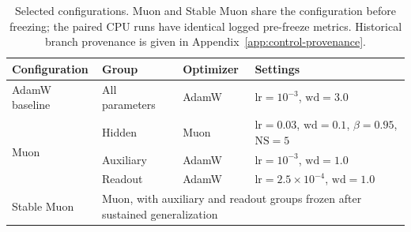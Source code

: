 \begin{table}[t]
\centering\small
\caption{Selected configurations. Muon and Stable Muon share the configuration before freezing; the paired CPU runs have identical logged pre-freeze metrics. Historical branch provenance is given in Appendix~\ref{app:control-provenance}.}
\label{tab:configs}
\begin{tabular}{llll}
\toprule
Configuration & Group & Optimizer & Settings \\
\midrule
AdamW baseline & All parameters & AdamW & $\text{lr}=10^{-3}$, $\text{wd}=3.0$ \\
\midrule
\multirow{3}{*}{Muon} & Hidden & Muon & $\text{lr}=0.03$, $\text{wd}=0.1$, $\beta=0.95$, $\text{NS}=5$ \\
 & Auxiliary & AdamW & $\text{lr}=10^{-3}$, $\text{wd}=1.0$ \\
 & Readout & AdamW & $\text{lr}=2.5\times10^{-4}$, $\text{wd}=1.0$ \\
\midrule
Stable Muon & \multicolumn{3}{l}{Muon, with auxiliary and readout groups frozen after sustained generalization} \\
\bottomrule
\end{tabular}
\end{table}
